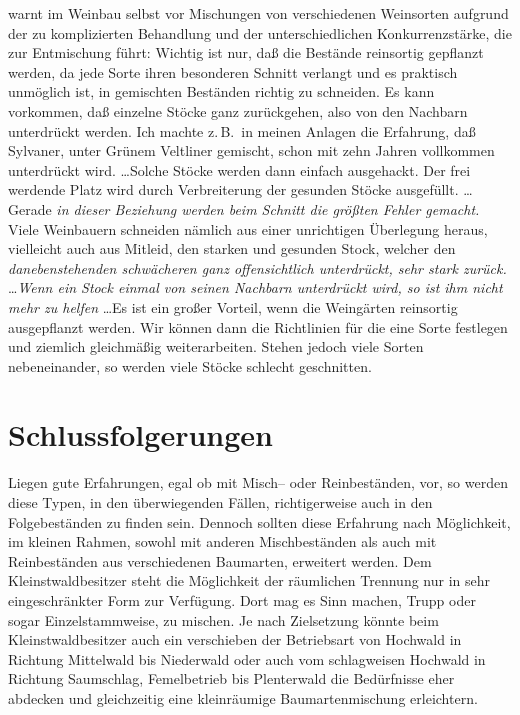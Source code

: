 \documentclass[twocolumn]{scrartcl}
\begin{document}
\citet[S.~126, 146 u.~152]{moser1966Weinbau} warnt im Weinbau selbst vor Mischungen von verschiedenen Weinsorten aufgrund der zu komplizierten Behandlung und der unterschiedlichen Konkurrenzstärke, die zur Entmischung führt: \frqq Wichtig ist nur, daß die Bestände reinsortig gepflanzt werden, da jede Sorte ihren besonderen Schnitt verlangt und es praktisch unmöglich ist, in gemischten Beständen richtig zu schneiden. Es kann vorkommen, daß einzelne Stöcke ganz zurückgehen, also von den Nachbarn unterdrückt werden. Ich machte z.\,B.\ in meinen Anlagen die Erfahrung, daß Sylvaner, unter Grünem Veltliner gemischt, schon mit zehn Jahren vollkommen unterdrückt wird. \dots Solche Stöcke werden dann einfach ausgehackt. Der frei werdende Platz wird durch Verbreiterung der gesunden Stöcke ausgefüllt. \dots Gerade \emph{in dieser Beziehung werden beim Schnitt die größten Fehler gemacht.} Viele Weinbauern schneiden nämlich aus einer unrichtigen Überlegung heraus, vielleicht auch aus Mitleid, den starken und gesunden Stock, welcher den \emph{danebenstehenden schwächeren ganz offensichtlich unterdrückt, sehr stark zurück.} \dots \emph{Wenn ein Stock einmal von seinen Nachbarn unterdrückt wird, so ist ihm nicht mehr zu helfen} \dots Es ist ein großer Vorteil, wenn die Weingärten reinsortig ausgepflanzt werden. Wir können dann die Richtlinien für die eine Sorte festlegen und ziemlich gleichmäßig weiterarbeiten. Stehen jedoch viele Sorten nebeneinander, so werden viele Stöcke schlecht geschnitten.\flqq{}

\section{Schlussfolgerungen}
\label{sec:schlussfolgerungen}

Liegen gute Erfahrungen, egal ob mit Misch-- oder Reinbeständen, vor, so werden
diese Typen, in den überwiegenden Fällen, richtigerweise auch in den
Folgebeständen zu finden sein. Dennoch sollten diese Erfahrung nach Möglichkeit,
im kleinen Rahmen, sowohl mit anderen Mischbeständen als auch mit Reinbeständen
aus verschiedenen Baumarten, erweitert werden. Dem Kleinstwaldbesitzer steht die Möglichkeit der räumlichen Trennung nur in sehr eingeschränkter Form zur Verfügung. Dort mag es Sinn machen, Trupp oder sogar Einzelstammweise, zu mischen. Je nach Zielsetzung könnte beim Kleinstwaldbesitzer auch ein verschieben der Betriebsart von Hochwald in Richtung Mittelwald bis Niederwald oder auch vom schlagweisen Hochwald in Richtung Saumschlag, Femelbetrieb bis Plenterwald die Bedürfnisse eher abdecken und gleichzeitig eine kleinräumige Baumartenmischung erleichtern.
\end{document}
